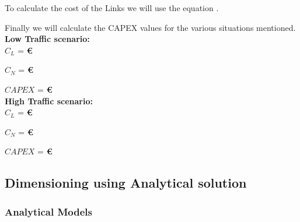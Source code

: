


To calculate the cost of the Links we will use the equation .

	

Finally we will calculate the CAPEX values for the various situations mentioned.\\

\textbf{Low Traffic scenario:}\\

$C_L$ = \textbf{\euro}

$C_N$ = \textbf{\euro}

$CAPEX$ = \textbf{\euro}\\

\textbf{High Traffic scenario:}\\

$C_L$ = \textbf{\euro}

$C_N$ = \textbf{ \euro}

$CAPEX$ =  \textbf{ \euro}\\

\subsection{Dimensioning using Analytical solution}

\subsubsection{Analytical Models}

